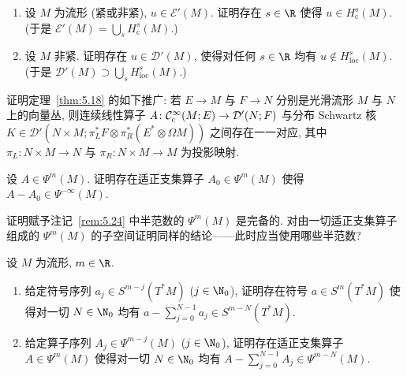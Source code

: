 \begin{exer}\label{ex:5.14}
\begin{enumerate}
    \item 设 $M$ 为流形 (紧或非紧), $u \in \mathscr{E}'(M)$. 证明存在 $s \in \R$ 使得 $u \in H_{\mathrm{c}}^s(M)$. (于是 $\mathscr{E}'(M) = \bigcup_s H_{\mathrm{c}}^s(M)$.)
    \item 设 $M$ 非紧. 证明存在 $u \in \mathcal{D}'(M)$, 使得对任何 $s \in \R$ 均有 $u \notin H_{\mathrm{loc}}^s(M)$. (于是 $\mathcal{D}'(M) \supset \bigcup_s H_{\mathrm{loc}}^s(M)$.)
\end{enumerate}
\end{exer}

\begin{exer}\label{ex:5.15}
证明定理~\ref{thm:5.18} 的如下推广: 若 $E \to M$ 与 $F \to N$ 分别是光滑流形 $M$ 与 $N$ 上的向量丛, 则连续线性算子 $A \colon \mathcal{C}_{\mathrm{c}}^\infty(M; E) \to \mathcal{D}'(N; F)$ 与分布 Schwartz 核 $K \in \mathcal{D}'(N \times M; \pi_L^* F \otimes \pi_R^*(E^* \otimes \Omega M))$ 之间存在一一对应, 其中 $\pi_L \colon N \times M \to N$ 与 $\pi_R \colon N \times M \to M$ 为投影映射.
\end{exer}

\begin{exer}[伪微分算子模去残余算子后为适正支集]\label{ex:5.16}
设 $A \in \Psi^m(M)$. 证明存在适正支集算子 $A_0 \in \Psi^m(M)$ 使得 $A - A_0 \in \Psi^{-\infty}(M)$.
\end{exer}

\begin{exer}\label{ex:5.17}
证明赋予注记~\ref{rem:5.24} 中半范数的 $\Psi^m(M)$ 是完备的. 对由一切适正支集算子组成的 $\Psi^m(M)$ 的子空间证明同样的结论——此时应当使用哪些半范数?
\end{exer}

\begin{exer}[流形上的渐近求和]\label{ex:5.18}
设 $M$ 为流形, $m \in \R$.
\begin{enumerate}
    \item 给定符号序列 $a_j \in S^{m-j}(T^* M)$ ($j \in \N_0$), 证明存在符号 $a \in S^m(T^* M)$ 使得对一切 $N \in \N_0$ 均有 $a - \sum_{j=0}^{N-1} a_j \in S^{m-N}(T^* M)$.
    \item 给定算子序列 $A_j \in \Psi^{m-j}(M)$ ($j \in \N_0$), 证明存在适正支集算子 $A \in \Psi^m(M)$ 使得对一切 $N \in \N_0$ 均有 $A - \sum_{j=0}^{N-1} A_j \in \Psi^{m-N}(M)$.
\end{enumerate}
\end{exer}

